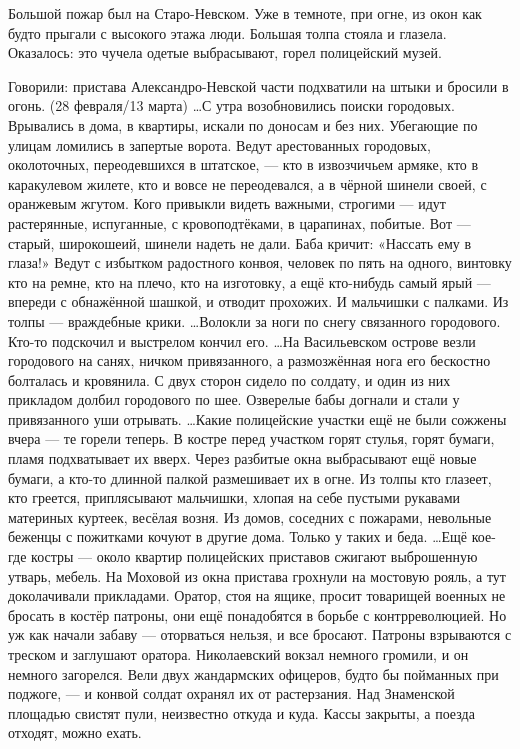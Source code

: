Большой пожар был на Старо-Невском. Уже в темноте, при огне, из окон как будто
прыгали с высокого этажа люди. Большая толпа стояла и глазела. Оказалось: это
чучела одетые выбрасывают, горел полицейский музей.

Говорили: пристава Александро-Невской части подхватили на штыки и бросили в огонь.
(28 февраля/13 марта)
…С утра возобновились поиски городовых. Врывались в дома, в квартиры, искали по доносам и без них. Убегающие по улицам ломились в запертые ворота. Ведут арестованных городовых, околоточных, переодевшихся в штатское, — кто в извозчичьем армяке, кто в каракулевом жилете, кто и вовсе не переодевался, а в чёрной шинели своей, с оранжевым жгутом. Кого привыкли видеть важными, строгими — идут растерянные, испуганные, с кровоподтёками, в царапинах, побитые.
Вот — старый, широкошеий, шинели надеть не дали. Баба кричит: «Нассать ему в глаза!»
Ведут с избытком радостного конвоя, человек по пять на одного, винтовку кто на ремне, кто на плечо, кто на изготовку, а ещё кто-нибудь самый ярый — впереди с обнажённой шашкой, и отводит прохожих. И мальчишки с палками.
Из толпы — враждебные крики.
…Волокли за ноги по снегу связанного городового. Кто-то подскочил и выстрелом кончил его.
…На Васильевском острове везли городового на санях, ничком привязанного, а размозжённая нога его бескостно болталась и кровянила. С двух сторон сидело по солдату, и один из них прикладом долбил городового по шее. Озверелые бабы догнали и стали у привязанного уши отрывать.
…Какие полицейские участки ещё не были сожжены вчера — те горели теперь. В костре перед участком горят стулья, горят бумаги, пламя подхватывает их вверх. Через разбитые окна выбрасывают ещё новые бумаги, а кто-то длинной палкой размешивает их в огне. Из толпы кто глазеет, кто греется, приплясывают мальчишки, хлопая на себе пустыми рукавами материных куртеек, весёлая возня.
Из домов, соседних с пожарами, невольные беженцы с пожитками кочуют в другие дома. Только у таких и беда.
…Ещё кое-где костры — около квартир полицейских приставов сжигают выброшенную утварь, мебель.
На Моховой из окна пристава грохнули на мостовую рояль, а тут доколачивали прикладами.
Оратор, стоя на ящике, просит товарищей военных не бросать в костёр патроны, они ещё понадобятся в борьбе с контрреволюцией. Но уж как начали забаву — оторваться нельзя, и все бросают. Патроны взрываются с треском и заглушают оратора.
Николаевский вокзал немного громили, и он немного загорелся. Вели двух жандармских офицеров, будто бы пойманных при поджоге, — и конвой солдат охранял их от растерзания. Над Знаменской площадью свистят пули, неизвестно откуда и куда. Кассы закрыты, а поезда отходят, можно ехать.
